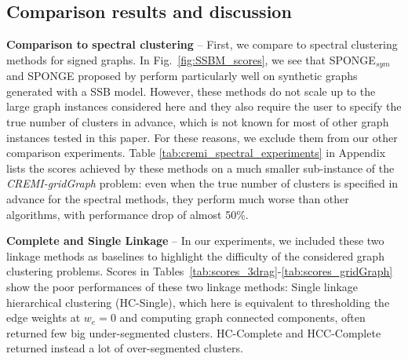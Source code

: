 \subsection{Comparison results and discussion}

\textbf{Comparison to spectral clustering} -- 
First, we compare \algname{} to spectral clustering methods for signed graphs. 
In Fig.~\ref{fig:SSBM_scores}, we see that SPONGE$_{sym}$ and SPONGE proposed by \cite{Cucuringu2019SPONGEAG} perform particularly well on synthetic graphs generated with a SSB model. However, these methods do not scale up to the large graph instances considered here and they also require the user to specify the true number of clusters in advance, which is not known for most of other graph instances tested in this paper. For these reasons, we exclude them from our other comparison experiments. Table \ref{tab:cremi_spectral_experiments} in Appendix lists the scores achieved by these methods on a much smaller sub-instance of the \emph{CREMI-gridGraph} problem: even when the true number of clusters is specified in advance for the spectral methods, they perform much worse than other \algname{} algorithms, with performance drop of almost 50\%.  

\textbf{Complete and Single Linkage} -- In our experiments, we included these two linkage methods as baselines to highlight the difficulty of the considered graph clustering problems. Scores in Tables~\ref{tab:scores_3drag}-\ref{tab:scores_gridGraph} show the poor performances of these two linkage methods: Single linkage hierarchical clustering (HC-Single), which here is equivalent to thresholding the edge weights at $w_e=0$ and computing graph connected components, often returned few big under-segmented clusters. HC-Complete and HCC-Complete returned instead a lot of over-segmented clusters. 

